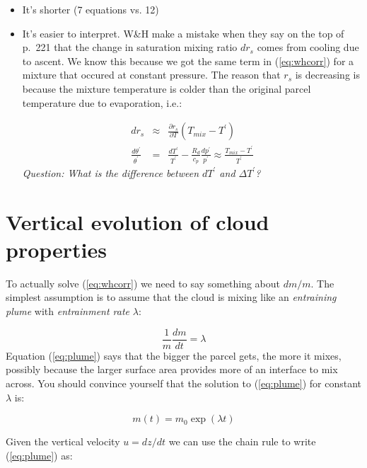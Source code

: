 \documentclass[12pt]{article}
\begin{document}
\begin{itemize}
\item It's shorter (7 equations vs. 12)
\item It's easier to interpret.  W\&H make a mistake when they say on the top of p.~221
that the change in saturation mixing ratio $dr_s$ comes from cooling due to ascent.  
We know this because we
got the same term in (\ref{eq:whcorr}) for a mixture that occured at constant pressure.
The reason that $r_s$ is decreasing is because the mixture temperature is colder than
the original parcel temperature due to evaporation, i.e.:

\begin{eqnarray}
  \label{eq:mix}
  dr_s &\approx& \frac{\partial r_s}{\partial T} (T_{mix} - T^\prime)\nonumber\\
  \frac{d\theta^\prime}{\theta^\prime} &=& \frac{dT^\prime}{T^\prime} - 
       \frac{R_d}{c_p}\frac{dp^\prime}{p^\prime} \approx \frac{T_{mix} - T^\prime}{T^\prime}
\end{eqnarray}
\textit{Question: What is the difference between $dT^\prime$ and $\Delta T^\prime$?}


\end{itemize}


\section{Vertical evolution of cloud properties}
\label{sec:vert-evol-cloud}

To actually solve (\ref{eq:whcorr}) we need to say something about
$dm/m$.  The simplest assumption is to assume that the cloud is mixing
like an \textit{entraining plume} with \textit{entrainment rate}
$\lambda$:

\begin{equation}
  \label{eq:plume}
  \frac{1}{m} \frac{dm}{dt} = \lambda
\end{equation}
Equation (\ref{eq:plume}) says that the bigger the parcel gets, the
more it mixes, possibly because the larger surface area provides more
of an interface to mix across.  You should convince yourself that
the solution to (\ref{eq:plume}) for constant $\lambda$ is:

\begin{equation}
  \label{eq:sol}
  m(t) = m_0 \exp ( \lambda  t)
\end{equation}

Given the vertical velocity $u=dz/dt$ we
can use the chain rule to write (\ref{eq:plume}) as:
\end{document}
